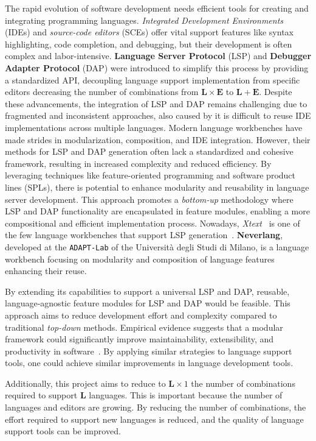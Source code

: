 The rapid evolution of software development needs efficient tools for creating and integrating programming languages. \textit{Integrated Development Environments} (IDEs) and \textit{source-code editors} (SCEs) offer vital support features like syntax highlighting, code completion, and debugging, but their development is often complex and labor-intensive. \textbf{Language Server Protocol} (LSP) and \textbf{Debugger Adapter Protocol} (DAP) were introduced to simplify this process by providing a standardized API, decoupling language support implementation from specific editors decreasing the number of combinations from $\mathbf{L} \times \mathbf{E}$ to $\mathbf{L} + \mathbf{E}$. Despite these advancements, the integration of LSP and DAP remains challenging due to fragmented and inconsistent approaches, also caused by it is difficult to reuse IDE implementations across multiple languages. Modern language workbenches have made strides in modularization, composition, and IDE integration. However, their methods for LSP and DAP generation often lack a standardized and cohesive framework, resulting in increased complexity and reduced efficiency. By leveraging techniques like feature-oriented programming and software product lines (SPLs), there is potential to enhance modularity and reusability in language server development. This approach promotes a \textit{bottom-up} methodology where LSP and DAP functionality are encapsulated in feature modules, enabling a more compositional and efficient implementation process. Nowadays, \textit{Xtext}~\cite{Bettini13b} is one of the few language workbenches that support LSP generation~\cite{Barros22}. \textbf{Neverlang}, developed at the \texttt{ADAPT-Lab} of the Universit\`a degli Studi di Milano, is a language workbench focusing on modularity and composition of language features enhancing their reuse.

By extending its capabilities to support a universal LSP and DAP, reusable, language-agnostic feature modules for LSP and DAP would be feasible. This approach aims to reduce development effort and complexity compared to traditional \textit{top-down} methods. Empirical evidence suggests that a modular framework could significantly improve maintainability, extensibility, and productivity in software~\cite{Sun17}. By applying similar strategies to language support tools, one could achieve similar improvements in language development tools.

Additionally, this project aims to reduce to $\mathbf{L} \times 1$ the number of combinations required to support $\mathbf{L}$ languages. This is important because the number of languages and editors are growing. By reducing the number of combinations, the effort required to support new languages is reduced, and the quality of language support tools can be improved.
